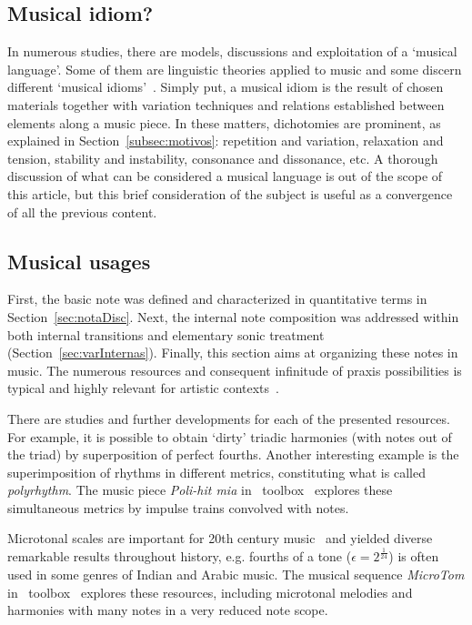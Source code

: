 \subsection{Musical idiom?}
In numerous studies, there are models, discussions and exploitation of a `musical language'.
Some of them are linguistic theories applied to music
and some discern different `musical
idioms'~\cite{Lerdahl, Harmonia, Salzer,Alfaix}. Simply put, a musical idiom
is the result of chosen materials together with variation techniques and
relations established between elements along a music piece. In these matters,
dichotomies are prominent, as explained in Section~\ref{subsec:motivos}:
repetition and variation, relaxation and tension, stability and instability, consonance and dissonance, etc.
A thorough discussion of what can be considered a musical language is out of the scope of this article, but this brief consideration of the subject is useful as a convergence of all the previous content.

\subsection{Musical usages}\label{subsec:usosmusicais3}
First, the basic note was defined and characterized in quantitative terms in Section~\ref{sec:notaDisc}.
Next, the internal note
composition was addressed within both internal transitions and elementary sonic treatment
(Section~\ref{sec:varInternas}). Finally, this section aims at organizing these notes in music. The numerous resources and consequent infinitude
of praxis possibilities is typical and highly relevant for artistic contexts~\cite{Harmonia,Webern}.

There are studies and further developments for each of the presented resources.
For example, it is possible to obtain `dirty' triadic harmonies (with notes out of the triad) by superposition of perfect fourths.
Another interesting example is the superimposition of rhythms in different metrics, constituting what is
called \emph{polyrhythm}. The music piece \emph{Poli-hit mia} in \massa\ toolbox~\cite{MASSA} explores these simultaneous metrics by impulse trains convolved with notes.

Microtonal scales are important for 20th
century music~\cite{microtonalidade} and yielded diverse remarkable results throughout history, e.g.
fourths of a tone ($\epsilon=2^{\frac{1}{24}}$) is often used in some genres of Indian and Arabic music. The musical sequence \emph{MicroTom} in \massa\ toolbox~\cite{MASSA} explores these resources, including microtonal melodies and harmonies
with many notes in a very reduced note scope.

